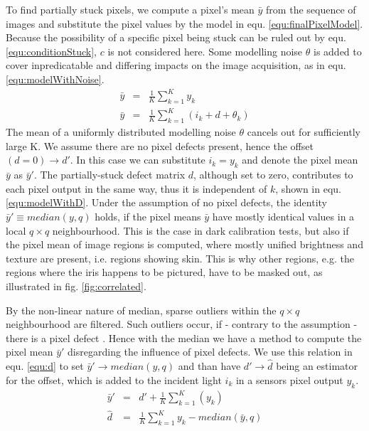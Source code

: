 \documentclass[10pt,twocolumn,letterpaper]{article}
\begin{document}
To find partially stuck pixels, we compute a pixel's mean $\bar{y}$ from the sequence of images and substitute the pixel values by the model in equ. \ref{equ:finalPixelModel}. Because the possibility of a specific pixel being stuck can be ruled out by equ. \ref{equ:conditionStuck}, $c$ is not considered here. Some modelling noise $\theta$ is added to cover inpredicatable and differing impacts on the image acquisition, as in equ. \ref{equ:modelWithNoise}.
\begin{eqnarray}
\bar{y} & = & \frac{1}{K}\sum\limits_{k=1}^{K}y_k \\
\bar{y} & = & \frac{1}{K}\sum\limits_{k=1}^{K}(i_k+d+\theta_k) \label{equ:modelWithNoise}
\end{eqnarray}
The mean of a uniformly distributed modelling noise $\theta$ cancels out for sufficiently large K. We assume there are no pixel defects present, hence the offset $(d=0) \rightarrow d'$. In this case we can substitute $i_k = y_k$ and denote the pixel mean $\bar{y}$ as $\bar{y}'$. The partially-stuck defect matrix $d$, although set to zero, contributes to each pixel output in the same way, thus it is independent of $k$, shown in equ. \ref{equ:modelWithD}. Under the assumption of no pixel defects, the identity $\bar{y}' \equiv median(y,q)$ holds, if the pixel means $\bar{y}$ have mostly identical values in a local $q \times q$ neighbourhood. This is the case in dark calibration tests, but also if the pixel mean of image regions is computed, where mostly unified brightness and texture are present, i.e. regions showing skin. This is why other regions, e.g. the regions where the iris happens to be pictured, have to be masked out, as illustrated in fig. \ref{fig:correlated}. 

By the non-linear nature of median, sparse outliers within the $q \times q$ neighbourhood are filtered. Such outliers occur, if - contrary to the assumption - there is a pixel defect \cite{fridrich}. Hence with the median we have a method to compute the pixel mean $\bar{y}'$ disregarding the influence of pixel defects. We use this relation in equ. \ref{equ:d} to set $\bar{y}' \rightarrow median(y,q)$ and than have $d' \rightarrow \hat{d}$ being an estimator for the offset, which is added to the incident light $i_k$ in a sensors pixel output $y_k$.
\begin{eqnarray}
\bar{y}' & = & d'+\frac{1}{K}\sum\limits_{k=1}^{K}(y_k) \label{equ:modelWithD} \\
\hat{d} & = & \frac{1}{K}\sum\limits_{k=1}^{K}y_k - median(\bar{y},q) \label{equ:d}
\end{eqnarray}
\end{document}
